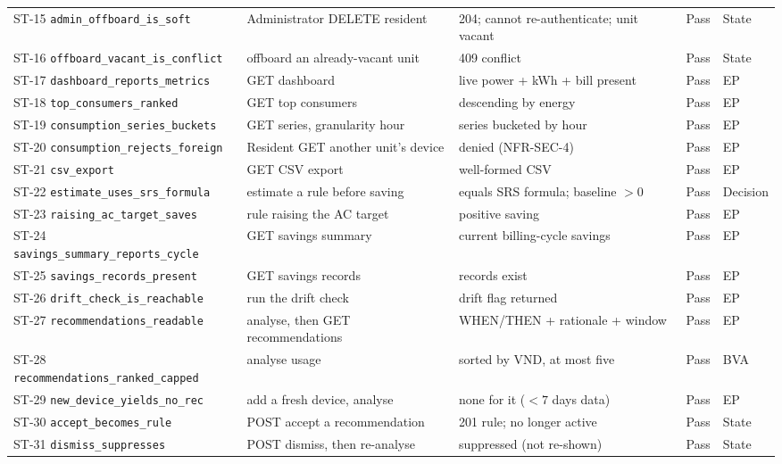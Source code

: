 {\begin{xltabular}{\textwidth}{@{}L{0.225\textwidth} X X c L{0.06\textwidth}@{}}
ST-15 \texttt{admin\_offboard\_is\_soft} & Administrator DELETE resident & 204; cannot re-authenticate; unit vacant & Pass & State \\
ST-16 \texttt{offboard\_vacant\_is\_conflict} & offboard an already-vacant unit & 409 conflict & Pass & State \\
ST-17 \texttt{dashboard\_reports\_metrics} & GET dashboard & live power + kWh + bill present & Pass & EP \\
ST-18 \texttt{top\_consumers\_ranked} & GET top consumers & descending by energy & Pass & EP \\
ST-19 \texttt{consumption\_series\_buckets} & GET series, granularity hour & series bucketed by hour & Pass & EP \\
ST-20 \texttt{consumption\_rejects\_foreign} & Resident GET another unit's device & denied (NFR-SEC-4) & Pass & EP \\
ST-21 \texttt{csv\_export} & GET CSV export & well-formed CSV & Pass & EP \\
ST-22 \texttt{estimate\_uses\_srs\_formula} & estimate a rule before saving & equals SRS formula; baseline $>0$ & Pass & Decision \\
ST-23 \texttt{raising\_ac\_target\_saves} & rule raising the AC target & positive saving & Pass & EP \\
ST-24 \texttt{savings\_summary\_reports\_cycle} & GET savings summary & current billing-cycle savings & Pass & EP \\
ST-25 \texttt{savings\_records\_present} & GET savings records & records exist & Pass & EP \\
ST-26 \texttt{drift\_check\_is\_reachable} & run the drift check & drift flag returned & Pass & EP \\
ST-27 \texttt{recommendations\_readable} & analyse, then GET recommendations & WHEN/THEN + rationale + window & Pass & EP \\
ST-28 \texttt{recommendations\_ranked\_capped} & analyse usage & sorted by VND, at most five & Pass & BVA \\
ST-29 \texttt{new\_device\_yields\_no\_rec} & add a fresh device, analyse & none for it ($<7$ days data) & Pass & EP \\
ST-30 \texttt{accept\_becomes\_rule} & POST accept a recommendation & 201 rule; no longer active & Pass & State \\
ST-31 \texttt{dismiss\_suppresses} & POST dismiss, then re-analyse & suppressed (not re-shown) & Pass & State \\
\bottomrule
\end{xltabular}}

